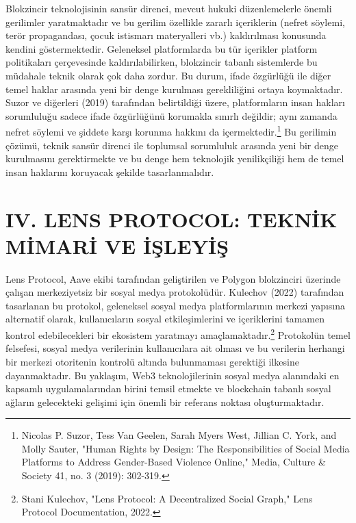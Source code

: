 \documentclass[11pt,a4paper]{article}
\begin{document}
Blokzincir teknolojisinin sansür direnci, mevcut hukuki düzenlemelerle önemli gerilimler yaratmaktadır ve bu gerilim özellikle zararlı içeriklerin (nefret söylemi, terör propagandası, çocuk istismarı materyalleri vb.) kaldırılması konusunda kendini göstermektedir. Geleneksel platformlarda bu tür içerikler platform politikaları çerçevesinde kaldırılabilirken, blokzincir tabanlı sistemlerde bu müdahale teknik olarak çok daha zordur. Bu durum, ifade özgürlüğü ile diğer temel haklar arasında yeni bir denge kurulması gerekliliğini ortaya koymaktadır. Suzor ve diğerleri (2019) tarafından belirtildiği üzere, platformların insan hakları sorumluluğu sadece ifade özgürlüğünü korumakla sınırlı değildir; aynı zamanda nefret söylemi ve şiddete karşı korunma hakkını da içermektedir.\footnote{Nicolas P. Suzor, Tess Van Geelen, Sarah Myers West, Jillian C. York, and Molly Sauter, "Human Rights by Design: The Responsibilities of Social Media Platforms to Address Gender-Based Violence Online," Media, Culture & Society 41, no. 3 (2019): 302-319.} Bu gerilimin çözümü, teknik sansür direnci ile toplumsal sorumluluk arasında yeni bir denge kurulmasını gerektirmekte ve bu denge hem teknolojik yenilikçiliği hem de temel insan haklarını koruyacak şekilde tasarlanmalıdır.

\section*{\fontsize{12}{14}\selectfont\bfseries IV. LENS PROTOCOL: TEKNİK MİMARİ VE İŞLEYİŞ}

Lens Protocol, Aave ekibi tarafından geliştirilen ve Polygon blokzinciri üzerinde çalışan merkeziyetsiz bir sosyal medya protokolüdür. Kulechov (2022) tarafından tasarlanan bu protokol, geleneksel sosyal medya platformlarının merkezi yapısına alternatif olarak, kullanıcıların sosyal etkileşimlerini ve içeriklerini tamamen kontrol edebilecekleri bir ekosistem yaratmayı amaçlamaktadır.\footnote{Stani Kulechov, "Lens Protocol: A Decentralized Social Graph," Lens Protocol Documentation, 2022.} Protokolün temel felsefesi, sosyal medya verilerinin kullanıcılara ait olması ve bu verilerin herhangi bir merkezi otoritenin kontrolü altında bulunmaması gerektiği ilkesine dayanmaktadır. Bu yaklaşım, Web3 teknolojilerinin sosyal medya alanındaki en kapsamlı uygulamalarından birini temsil etmekte ve blockchain tabanlı sosyal ağların gelecekteki gelişimi için önemli bir referans noktası oluşturmaktadır.
\end{document}
